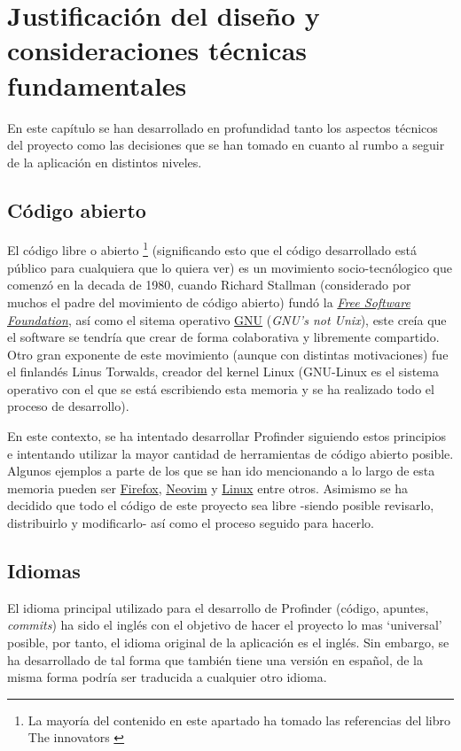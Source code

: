 \chapter{Justificación del diseño y consideraciones técnicas fundamentales}
\label{cap:JustificacionYConsideraciones}
En este capítulo se han desarrollado en profundidad tanto los aspectos técnicos del proyecto como las decisiones que se han tomado en cuanto al rumbo a seguir de la aplicación en distintos niveles.
\section{Código abierto}
El código libre o abierto
\footnote{La mayoría del contenido en este apartado ha tomado las referencias del libro The innovators \citep{Innovators}} 
(significando esto que el código desarrollado está público para cualquiera que lo quiera ver)
es un movimiento socio-tecnólogico que comenzó en la decada de 1980, cuando Richard Stallman (considerado por muchos el padre del movimiento de código abierto) fundó la \href{https://www.fsf.org/}{\textit{Free Software Foundation}}, así como el sitema operativo \href{https://www.gnu.org/}{GNU} (\textit{GNU's not Unix}), este creía que el software se tendría que crear de forma colaborativa y libremente compartido. Otro gran exponente de este movimiento (aunque con distintas motivaciones) fue el finlandés Linus Torwalds, creador del kernel Linux (GNU-Linux es el sistema operativo con el que se está escribiendo esta memoria y se ha realizado todo el proceso de desarrollo).

En este contexto, se ha intentado desarrollar Profinder siguiendo estos principios e intentando utilizar la mayor cantidad de herramientas de código abierto posible. Algunos ejemplos a parte de los que se han ido mencionando a lo largo de esta memoria pueden ser \href{https://www.mozilla.org/es-ES/firefox/}{Firefox}, \href{https://neovim.io/}{Neovim} y \href{https://www.linux.org/pages/}{Linux} entre otros. Asimismo se ha decidido que todo el código de este proyecto sea libre -siendo posible revisarlo, distribuirlo y modificarlo- así como el proceso seguido para hacerlo.

\section{Idiomas}
El idioma principal utilizado para el desarrollo de Profinder (código, apuntes, \textit{commits}) ha sido el inglés con el objetivo de hacer el proyecto lo mas ‘universal’ posible, por tanto, el idioma original de la aplicación es el inglés. Sin embargo, se ha desarrollado de tal forma que también tiene una versión en español, de la misma forma podría ser traducida a cualquier otro idioma.

